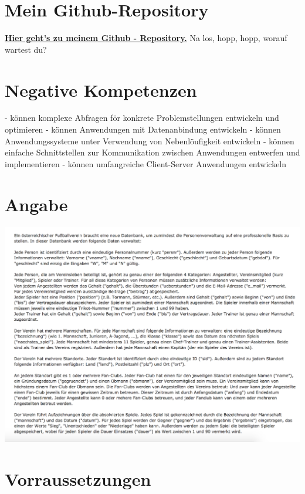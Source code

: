 
\section{Mein Github-Repository}
\href{https://github.com/lbreier-tgm/fussball}{\textbf{Hier geht's zu meinem Github - Repository.}}\newline
Na los, hopp, hopp, worauf wartest du?

\section{Negative Kompetenzen}
- können komplexe Abfragen för konkrete Problemstellungen entwickeln und optimieren \newline
- können Anwendungen mit Datenanbindung entwickeln \newline
- können Anwendungssysteme unter Verwendung von Nebenlöufigkeit entwickeln \newline
- können einfache Schnittstellen zur Kommunikation zwischen Anwendungen entwerfen und implementieren \newline
- können umfangreiche Client-Server Anwendungen entwickeln \newline

\section{Angabe}
\includegraphics[scale=0.5]{images/angabe.png}

\section{Vorraussetzungen}
